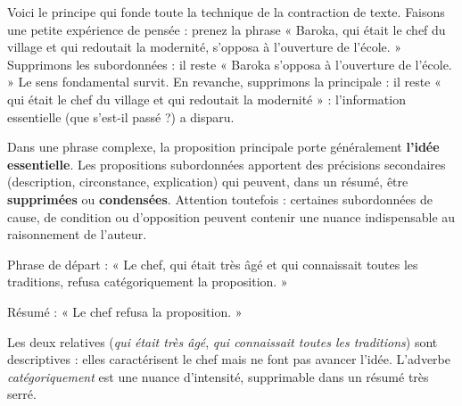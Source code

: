 \documentclass[11pt]{article}
\newcommand{\cle}[1]{{\popxbold\color{popdark}#1}}
\begin{document}
Voici le principe qui fonde toute la technique de la contraction de texte. Faisons une petite expérience de pensée : prenez la phrase « Baroka, qui était le chef du village et qui redoutait la modernité, s'opposa à l'ouverture de l'école. » Supprimons les subordonnées : il reste « Baroka s'opposa à l'ouverture de l'école. » Le sens fondamental survit. En revanche, supprimons la principale : il reste « qui était le chef du village et qui redoutait la modernité » : l'information essentielle (que s'est-il passé ?) a disparu.

\begin{propriete}
Dans une phrase complexe, la \cle{proposition principale} porte généralement \textbf{l'idée essentielle}. Les propositions subordonnées apportent des précisions secondaires (description, circonstance, explication) qui peuvent, dans un résumé, être \textbf{supprimées} ou \textbf{condensées}. Attention toutefois : certaines subordonnées de cause, de condition ou d'opposition peuvent contenir une nuance indispensable au raisonnement de l'auteur.
\end{propriete}

\begin{exemplebox}
Phrase de départ : « Le chef, qui était très âgé et qui connaissait toutes les traditions, refusa catégoriquement la proposition. »

Résumé : « Le chef refusa la proposition. »

Les deux relatives (\emph{qui était très âgé}, \emph{qui connaissait toutes les traditions}) sont descriptives : elles caractérisent le chef mais ne font pas avancer l'idée. L'adverbe \emph{catégoriquement} est une nuance d'intensité, supprimable dans un résumé très serré.
\end{exemplebox}
\end{document}
